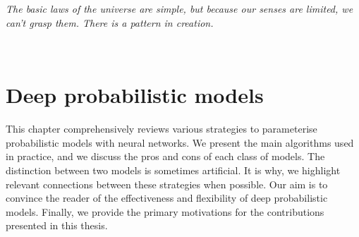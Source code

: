\thispagestyle{empty}
\section*{}

%

\vfill

{
\textit{\justify
   The basic laws of the universe are simple, but because our senses are limited, we can't grasp them. There is a pattern in creation.}

  \par\bigskip
  \\
  \par%
}

\vfill

\chapter{Deep probabilistic models}\label{ch:02C}

\begin{chapter_outline}

This chapter comprehensively reviews various strategies to parameterise probabilistic models with neural networks. We present the main algorithms used in practice, and we discuss the pros and cons of each class of models.
The distinction between two models is sometimes artificial. It is why, we highlight relevant connections between these strategies when possible.
Our aim is to convince the reader of the effectiveness and flexibility of deep probabilistic models. Finally, we provide the primary motivations for the contributions presented in this thesis.
\end{chapter_outline}

